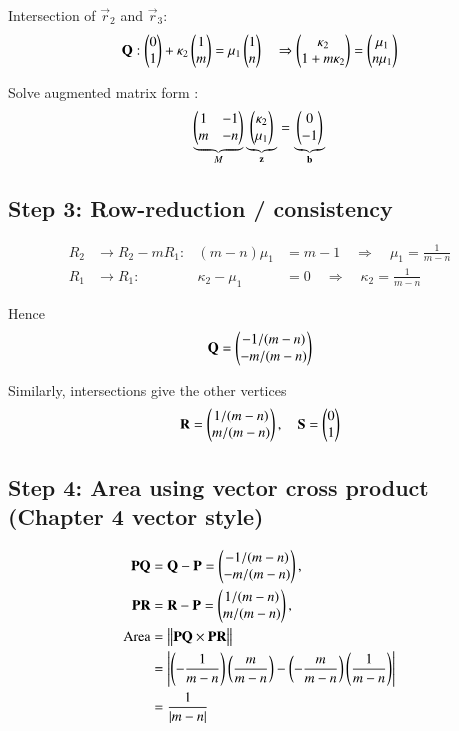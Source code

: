 \documentclass[journal]{IEEEtran}
\begin{document}
Intersection of \(\vec{r}_2\) and \(\vec{r}_3\):
\[
\mathbf{Q} : \begin{pmatrix}0\\1\end{pmatrix} + \kappa_2 \begin{pmatrix}1\\m\end{pmatrix} = \mu_1 \begin{pmatrix}1\\n\end{pmatrix} \quad \Rightarrow 
\begin{pmatrix} \kappa_2 \\ 1 + m \kappa_2 \end{pmatrix} = 
\begin{pmatrix} \mu_1 \\ n \mu_1 \end{pmatrix}
\]

Solve augmented matrix form :
\[
\underbrace{\begin{pmatrix} 1 & -1 \\ m & -n \end{pmatrix}}_{M} 
\underbrace{\begin{pmatrix}\kappa_2 \\ \mu_1\end{pmatrix}}_{\mathbf{z}} = 
\underbrace{\begin{pmatrix}0 \\ -1\end{pmatrix}}_{\mathbf{b}}
\]

\subsection*{Step 3: Row-reduction / consistency}

\begin{align*}
R_2 &\to R_2 - m R_1: & (m - n) \mu_1 &= m - 1 \quad \Rightarrow \quad \mu_1 = \frac{1}{m-n} \\
R_1 &\to R_1: & \kappa_2 - \mu_1 &= 0 \quad \Rightarrow \quad \kappa_2 = \frac{1}{m-n}
\end{align*}

Hence
\[
\mathbf{Q} = \begin{pmatrix}-1/(m-n)\\-m/(m-n)\end{pmatrix}
\]

Similarly, intersections give the other vertices
\[
\mathbf{R} = \begin{pmatrix}1/(m-n)\\m/(m-n)\end{pmatrix}, \quad \mathbf{S} = \begin{pmatrix}0\\1\end{pmatrix}
\]

\subsection*{Step 4: Area using vector cross product (Chapter 4 vector style)}

\begin{align}
\mathbf{PQ} &= \mathbf{Q} - \mathbf{P} = \begin{pmatrix}-1/(m-n)\\-m/(m-n)\end{pmatrix}, \\
\mathbf{PR} &= \mathbf{R} - \mathbf{P} = \begin{pmatrix}1/(m-n)\\ m/(m-n)\end{pmatrix}, \\
\text{Area} &= \big\| \mathbf{PQ} \times \mathbf{PR} \big\| \\
&= \left| \left(-\frac{1}{m-n}\right)\left(\frac{m}{m-n}\right) - \left(-\frac{m}{m-n}\right) \left(\frac{1}{m-n}\right) \right| \\
&= \frac{1}{|m-n|}
\end{align}
\end{document}
